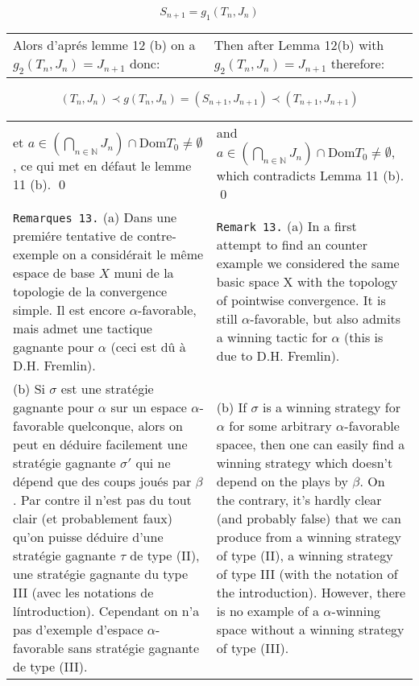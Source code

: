 \documentclass[12pt]{article}
\theoremstyle{plain}
\theoremstyle{definition}
\theoremstyle{remark}
\begin{document}
\begin{equation}
S_{n+1} = g_1(T_n,J_n)
\end{equation}

\begin{tabular}{p{2.8in} p{2.8in}}

Alors d'apr\'es lemme 12 (b) on a $g_2(T_n,J_n)=J_{n+1}$ donc:

&

Then after Lemma 12(b) with $g_2(T_n,J_n)=J_{n+1}$ therefore:

\end{tabular}

\[
(T_n,J_n) \prec g(T_n,J_n) = (S_{n+1},J_{n+1})\prec (T_{n+1},J_{n+1})
\]

\begin{tabular}{p{2.8in} p{2.8in}}

et $a \in \left(\bigcap_{n\in\mathbb{N}}J_n\right)\cap \textrm{Dom}T_0 \not=\emptyset$, ce qui met en d\'efaut le lemme 11 (b). \qed

&

and $a \in \left(\bigcap_{n\in\mathbb{N}}J_n\right)\cap \textrm{Dom}T_0 \not=\emptyset$, which contradicts Lemma 11 (b). \qed

\\

\texttt{Remarques 13.} (a) Dans une premi\'ere tentative de contre-exemple on a consid\'erait le m\^eme espace de base $X$ muni de la topologie de la convergence simple. Il est encore $\alpha$-favorable, mais admet une tactique gagnante pour $\alpha$ (ceci est d\^u \`a D.H. Fremlin).

&

\texttt{Remark 13.} (a) In a first attempt to find an counter example we considered the same basic space X with the topology of pointwise convergence. It is still $\alpha$-favorable, but also admits a winning tactic for $\alpha$ (this is due to D.H. Fremlin).

\\

(b) Si $\sigma$ est une strat\'egie gagnante pour $\alpha$ sur un espace $\alpha$-favorable quelconque, alors on peut en d\'eduire facilement une strat\'egie gagnante $\sigma'$ qui ne d\'epend que des coups jou\'es par $\beta$. Par contre il n'est pas du tout clair (et probablement faux) qu'on puisse d\'eduire d'une strat\'egie gagnante $\tau$ de type (II), une strat\'egie gagnante du type III (avec les notations de l\'introduction). Cependant on n'a pas d'exemple d'espace $\alpha$-favorable sans strat\'egie gagnante de type (III).

&

(b) If $\sigma$ is a winning strategy for $\alpha$ for some arbitrary $\alpha$-favorable spacee, then one can easily find a winning strategy which doesn't depend on the plays by $\beta$. On the contrary, it's hardly clear (and probably false) that we can produce from a winning strategy of type (II), a winning strategy of type III (with the notation of the introduction). However, there is no example of a  $\alpha$-winning space without a winning strategy of type (III).

\end{tabular}
\end{document}
